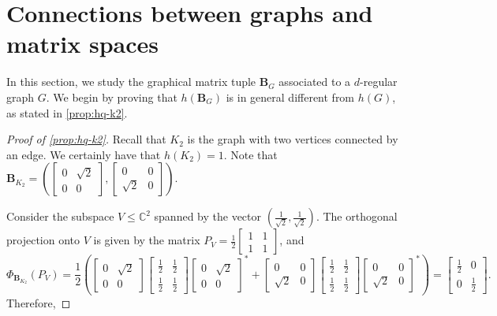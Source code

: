 \documentclass{toc}
\theoremstyle{plain}
\numberwithin{equation}{section}
\theoremstyle{definition}
\newcommand{\bC}{\mathbb{C}}
\newcommand{\tuple}[1]{\mathbf{#1}}
\newcommand{\vB}{\tuple{B}}
\newcommand\smat[1]{\left[\begin{smallmatrix}#1\end{smallmatrix}\right]}
\begin{document}
\section{Connections between graphs and matrix spaces}\label{sec:connections}
In this section, we study the graphical matrix tuple $\vB_G$ associated to a $d$-regular graph $G$.
We begin by proving that $h(\vB_G)$ is in general different from $h(G)$, as stated in \cref{prop:hq-k2}.
\begin{proof}[Proof of \cref{prop:hq-k2}]
	Recall that $K_2$ is the graph with two vertices connected by an edge. 
    We certainly have that $h(K_2)=1$. Note that $\vB_{K_2} = \left(\smat{0&\sqrt 2\\0&0}, \smat{0&0\\\sqrt 2&0}\right)$.

    Consider the subspace $V \leq \bC^2$ spanned by the vector $(\frac{1}{\sqrt 2},\frac{1}{\sqrt 2})$. The orthogonal projection onto $V$ is given by the matrix $P_V = \frac 12\smat{1&1\\ 1 & 1}$, and
    \[
        \Phi_{\vB_{K_2}} (P_V) = \frac 12 \left(
        \begin{bmatrix}
            0&\sqrt 2\\0&0
        \end{bmatrix}
        \begin{bmatrix}
            \frac 12 & \frac 12 \\ \frac 12&\frac 12
        \end{bmatrix}
        \begin{bmatrix}
            0&\sqrt 2\\0&0
        \end{bmatrix}^*
        +
        \begin{bmatrix}
            0&0\\\sqrt 2&0
        \end{bmatrix}
        \begin{bmatrix}
            \frac 12 & \frac 12 \\ \frac 12&\frac 12
        \end{bmatrix}
        \begin{bmatrix}
            0&0\\\sqrt 2&0
        \end{bmatrix}^*
        \right)
        =
        \begin{bmatrix}
            \frac 12 &0\\0&\frac 12
        \end{bmatrix}.
    \]
    Therefore,

\end{proof}
\end{document}
